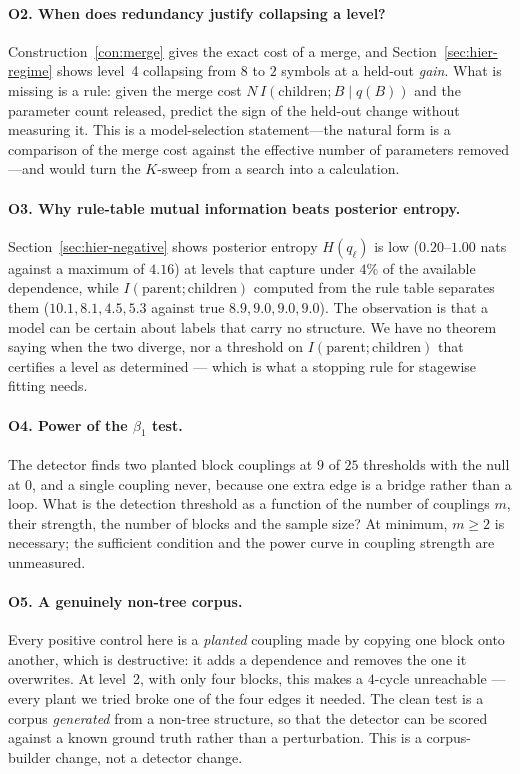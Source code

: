 \paragraph{O2. When does redundancy justify collapsing a level?}
Construction~\ref{con:merge} gives the exact cost of a merge, and
Section~\ref{sec:hier-regime} shows level~4 collapsing from $8$ to $2$ symbols
at a held-out \emph{gain}. What is missing is a rule: given the merge cost
$N\,I(\text{children};B\mid q(B))$ and the parameter count released, predict the
sign of the held-out change without measuring it. This is a model-selection
statement---the natural form is a comparison of the merge cost against the
effective number of parameters removed---and would turn the $K$-sweep from a
search into a calculation.

\paragraph{O3. Why rule-table mutual information beats posterior entropy.}
Section~\ref{sec:hier-negative} shows posterior entropy $H(q_\ell)$ is low
($0.20$--$1.00$ nats against a maximum of $4.16$) at levels that capture under
$4\%$ of the available dependence, while $I(\text{parent};\text{children})$
computed from the rule table separates them ($10.1, 8.1, 4.5, 5.3$ against true
$8.9, 9.0, 9.0, 9.0$). The observation is that a model can be certain about
labels that carry no structure. We have no theorem saying when the two
diverge, nor a threshold on $I(\text{parent};\text{children})$ that certifies a
level as determined --- which is what a stopping rule for stagewise fitting
needs.

\paragraph{O4. Power of the $\beta_1$ test.}
The detector finds two planted block couplings at $9$ of $25$ thresholds with
the null at $0$, and a single coupling never, because one extra edge is a
bridge rather than a loop. What is the detection threshold as a function of the
number of couplings $m$, their strength, the number of blocks and the sample
size? At minimum, $m \ge 2$ is necessary; the sufficient condition and the
power curve in coupling strength are unmeasured.

\paragraph{O5. A genuinely non-tree corpus.}
Every positive control here is a \emph{planted} coupling made by copying one
block onto another, which is destructive: it adds a dependence and removes the
one it overwrites. At level~2, with only four blocks, this makes a $4$-cycle
unreachable --- every plant we tried broke one of the four edges it needed. The
clean test is a corpus \emph{generated} from a non-tree structure, so that the
detector can be scored against a known ground truth rather than a perturbation.
This is a corpus-builder change, not a detector change.

